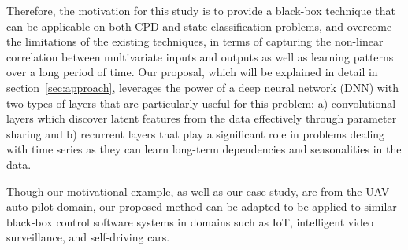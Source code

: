 Therefore, the motivation for this study is to provide a black-box technique that can be applicable on both CPD and state classification problems, and overcome the limitations of the existing techniques, in terms of capturing the non-linear correlation between multivariate inputs and outputs as well as learning patterns over a long period of time. Our proposal, which will be explained in detail in section~\ref{sec:approach}, leverages the power of a deep neural network (DNN) with two types of layers that are particularly useful for this problem: a) convolutional layers which discover latent features from the data effectively through parameter sharing and b) recurrent layers that play a significant role in problems dealing with time series as they can learn long-term dependencies and seasonalities in the data. 

Though our motivational example, as well as our case study, are from the UAV auto-pilot domain, our proposed method can be adapted to be applied to similar black-box control software systems in domains such as IoT, intelligent video surveillance, and self-driving cars.
